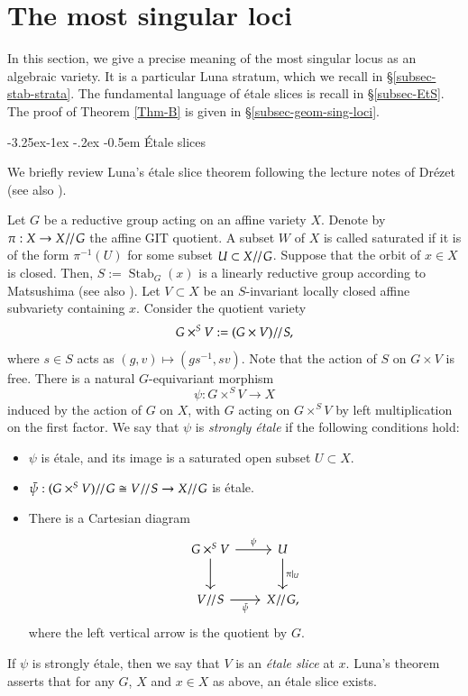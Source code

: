 \documentclass[11pt,oneside,dvipsnames]{amsart}
\makeatletter
\renewcommand\subsection{\@startsection{subsection}{3}{\z@}%
                                     {-3.25ex\@plus -1ex \@minus -.2ex}%
                                     {-0.5em}%
                                     {\normalfont\normalsize\bfseries}}
\theoremstyle{plain}
\theoremstyle{definition}
\theoremstyle{named}
\DeclareMathOperator{\Stab}{Stab}
\DeclareMathOperator{\ds}{\!/\mkern-2mu/\mkern-2mu}
\makeatother
\begin{document}
\section{The most singular loci}\label{sec-sing-loci}

In this section, we give a precise meaning of the most singular locus as an algebraic variety. It is a particular Luna stratum, which we recall in \S \ref{subsec-stab-strata}. The fundamental language of \'etale slices is recall in \S \ref{subsec-EtS}. The proof of Theorem \ref{Thm-B} is given in \S \ref{subsec-geom-sing-loci}.

\subsection{\'Etale slices}\label{subsec-EtS}\hfill

We briefly review Luna's \'etale slice theorem following the lecture notes of Dr\'ezet \cite{Dre2} (see also \cite{Lu}).

Let $G$ be a reductive group acting on an affine variety $X$. Denote by $\pi:X\rightarrow X\ds G$ the affine GIT quotient. A subset $W$ of $X$ is called saturated if it is of the form $\pi^{-1}(U)$ for some subset $U\subset X\ds G$. Suppose that the orbit of $x\in X$ is closed. Then, $S:=\Stab_G(x)$ is a linearly reductive group according to Matsushima \cite{Mat} (see also  \cite[Theorem A]{Ri77}). Let $V\subset X$ be an $S$-invariant locally closed affine subvariety containing $x$. Consider the quotient variety
$$
G\times^SV:=(G\times V)\ds S,
$$
where $s\in S$ acts as $(g,v)\mapsto (gs^{-1},sv)$. Note that the action of $S$ on $G\times V$ is free. There is a natural $G$-equivariant morphism
$$
\psi:G\times^SV\longrightarrow X
$$
induced by the action of $G$ on $X$, with $G$ acting on $G\times^SV$ by left multiplication on the first factor. We say that $\psi$ is \textit{strongly \'etale} if the following conditions hold:
\begin{itemize}
\item[(i)] $\psi$ is \'etale, and its image is a saturated open subset $U\subset X$.
\item[(ii)] $\bar{\psi}:(G\times^SV)\ds G\cong V\ds S\rightarrow X\ds G$ is \'etale.
\item[(iii)] There is a Cartesian diagram
\begin{equation}\label{eq-str-et-Cart}
\begin{tikzcd}[row sep=2.5em, column sep=2em]
G\times^SV \arrow[r, "\psi"] \arrow[d, swap] & U \arrow[d, "\pi|_U"]\\
V\ds S \arrow[r, "\bar{\psi}"'] & X\ds G,
\end{tikzcd}
\end{equation}
where the left vertical arrow is the quotient by $G$.
\end{itemize}
If $\psi$ is strongly \'etale, then we say that $V$ is an \textit{\'etale slice} at $x$. Luna's theorem asserts that for any $G$, $X$ and $x\in X$ as above, an \'etale slice exists.
\end{document}
